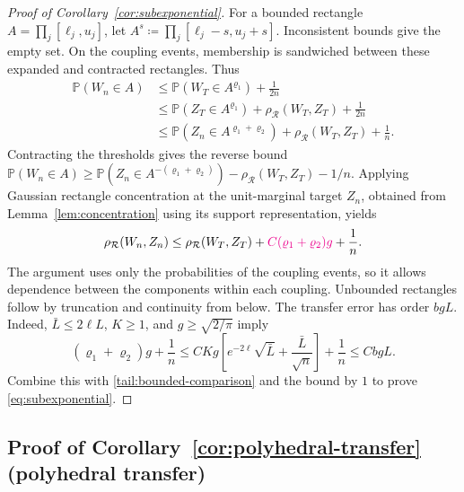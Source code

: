 \documentclass[11pt,letterpaper]{article}
\newcommand{\vSix}[1]{{\color{magenta}#1}}
\newenvironment{vSixBlock}{\color{magenta}}{}
\theoremstyle{remark}
\newcommand{\Pp}{\mathbb P}
\newcommand{\rh}{\rho_{\mathcal R}}
\begin{document}
\begin{proof}[Proof of Corollary~\ref{cor:subexponential}]
For a bounded rectangle \(A=\prod_j[\ell_j,u_j]\), let
\(A^s\coloneqq\prod_j[\ell_j-s,u_j+s]\). Inconsistent bounds
give the empty set. On the coupling events, membership is sandwiched
between these expanded and contracted rectangles. Thus
\begin{align*}
 \Pp(W_n\in A)
 &\le\Pp(W_T\in A^{\varrho_1})+\frac1{2n}\\
 &\le\Pp(Z_T\in A^{\varrho_1})+\rh(W_T,Z_T)+\frac1{2n}\\
 &\le\Pp(Z_n\in A^{\varrho_1+\varrho_2})+\rh(W_T,Z_T)+\frac1n.
\end{align*}
Contracting the thresholds gives the reverse bound
\(\Pp(W_n\in A)\ge\Pp(Z_n\in A^{-(\varrho_1+\varrho_2)})
-\rh(W_T,Z_T)-1/n\). Applying Gaussian rectangle concentration at
the unit-marginal target \(Z_n\), obtained from Lemma~\ref{lem:concentration}
using its support representation, yields
\begin{equation}
 \rh(W_n,Z_n)\le\rh(W_T,Z_T)
       +\vSix{C(\varrho_1+\varrho_2)g}+\frac1n.
 \label{tail:transfer}
\end{equation}
The argument uses only the probabilities of the coupling events,
so it allows dependence between the components within each coupling. Unbounded
rectangles follow by truncation and continuity from below.
\begin{vSixBlock}
The transfer error has order \(bgL\). Indeed,
\(\bar L\le2\ell L\), \(K\ge1\), and
\(g\ge\sqrt{2/\pi}\) imply
\[
 (\varrho_1+\varrho_2)g+\frac1n
 \le CKg\left[e^{-2\ell}\sqrt{\bar L}
                    +\frac{\bar L}{\sqrt n}\right]+\frac1n
 \le CbgL.
\]
\end{vSixBlock}
Combine this with \eqref{tail:bounded-comparison} and the bound by \(1\)
to prove \eqref{eq:subexponential}.

\end{proof}

\subsection{Proof of Corollary~\ref*{cor:polyhedral-transfer} (polyhedral transfer)}
\label{app:polyhedral-transfer}
\end{document}
